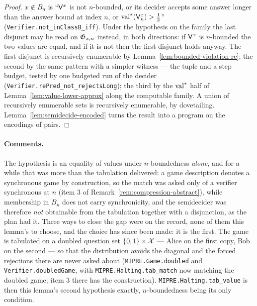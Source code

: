 \begin{proof}
\leanok
{}
$x \notin B_n$ is ``$\mathsf{V}^x$ is not $n$-bounded, or its decider accepts some answer
longer than the answer bound at index $n$, or $\mathrm{val}^*(\mathsf{V}^x_n) > \frac12$''
(\texttt{Verifier.not\_inClassB\_iff}). Under the hypothesis on the family the last disjunct
may be read on $\mathfrak{G}_{x,n}$ instead, in both directions: if $\mathsf{V}^x$ is $n$-bounded the
two values are equal, and if it is not then the first disjunct holds anyway. The first
disjunct is recursively enumerable by Lemma~\ref{lem:bounded-violation-re}; the second by the
same pattern with a simpler witness --- the tuple and a step budget, tested by one budgeted
run of the decider (\texttt{Verifier.rePred\_not\_rejectsLong}); the third by the $\mathrm{val}^*$
half of Lemma~\ref{lem:value-lower-approx} along the computable family. A union of recursively
enumerable sets is recursively enumerable, by dovetailing. Lemma~\ref{lem:semidecide-encoded}
turns the result into a program on the encodings of pairs.
\end{proof}

\paragraph{Comments.} The hypothesis is an equality of values under $n$-boundedness
\emph{alone}, and for a while that was more than the tabulation delivered: a game description
denotes a synchronous game by construction, so the match was asked only of a verifier
synchronous at $n$ (item 3 of Remark~\ref{rem:compression-abstract}), while membership in
$B_n$ does not carry synchronicity, and the semidecider was therefore \emph{not} obtainable
from the tabulation together with a disjunction, as the plan had it. Three ways to close the
gap were on the record, none of them this lemma's to choose, and the choice has since been
made: it is the first. The game is tabulated on a doubled question set
$\{0,1\} \times \mathcal{X}$ --- Alice on the first copy, Bob on the second --- so that the
distribution avoids the diagonal and the forced rejections there are never asked about
(\texttt{MIPRE.Game.doubled} and \texttt{Verifier.doubledGame}, with
\texttt{MIPRE.Halting.tab\_match} now matching the doubled game; item 3 there has the
construction). \texttt{MIPRE.Halting.tab\_value} is then this lemma's second hypothesis
exactly, $n$-boundedness being its only condition.

